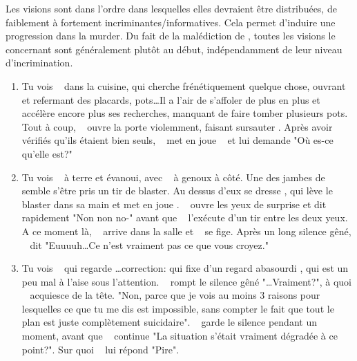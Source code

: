 {	\par Les visions sont dans l'ordre dans lesquelles elles devraient être distribuées, de faiblement à fortement incriminantes/informatives. Cela permet d'induire une progression dans la murder. Du fait de la malédiction de \nmPlayerXI, toutes les visions le concernant sont généralement plutôt au début, indépendamment de leur niveau d'incrimination.
	
	\begin{enumerate}
		\item Tu vois \nmPlayerII ~ dans la cuisine, qui cherche frénétiquement quelque chose, ouvrant et refermant des placards, pots\dots Il a l'air de s'affoler de plus en plus et accélère encore plus ses recherches, manquant de faire tomber plusieurs pots. Tout à coup, \nmPlayerVIII ~ ouvre la porte violemment, faisant sursauter \nmPlayerII. Après avoir vérifiés qu'ils étaient bien seuls, \nmPlayerVIII ~ met en joue \nmPlayerII ~ et lui demande "Où es-ce qu'elle est?"
		
		\item Tu vois \nmPlayerII ~ à terre et évanoui, avec \nmPlayerI ~ à genoux à côté. Une des jambes de \nmPlayerI ~ semble s'être pris un tir de blaster. Au dessus d'eux se dresse \nmPlayerXI, qui lève le blaster dans sa main et met en joue \nmPlayerI. \nmPlayerI ~ ouvre les yeux de surprise et dit rapidement "Non non no-" avant que \nmPlayerXI ~ l'exécute d'un tir entre les deux yeux. A ce moment là, \nmPlayerVII ~ arrive dans la salle et \nmPlayerXI ~ se fige. Après un long silence gêné, \nmPlayerXI ~ dit "Euuuuh\dots Ce n'est vraiment pas ce que vous croyez."
		
		\item Tu vois \nmPlayerVII ~ qui regarde \nmPlayerV\dots correction: qui fixe d'un regard abasourdi \nmPlayerV, qui est un peu mal à l'aise sous l'attention. \nmPlayerVII ~ rompt le silence gêné "\dots Vraiment?", à quoi \nmPlayerV ~ acquiesce de la tête. "Non, parce que je vois au moins 3 raisons pour lesquelles ce que tu me dis est impossible, sans compter le fait que tout le plan est juste complètement suicidaire". \nmPlayerV ~ garde le silence pendant un moment, avant que \nmPlayerVII ~ continue "La situation s'était vraiment dégradée à ce point?". Sur quoi \nmPlayerV ~ lui répond "Pire".
		

\end{enumerate}}
